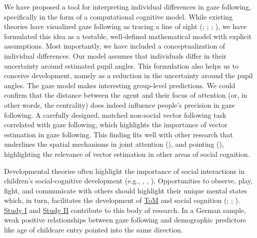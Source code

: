 \documentclass[
]{scrbook}
\begin{document}
We have proposed a tool for interpreting individual differences in gaze following, specifically in the form of a computational cognitive model. While existing theories have visualized gaze following as tracing a line of sight (; ; ; ), we have formulated this idea as a testable, well-defined mathematical model with explicit assumptions. Most importantly, we have included a conceptualization of individual differences. Our model assumes that individuals differ in their uncertainty around estimated pupil angles. This formulation also helps us to conceive development, namely as a reduction in the uncertainty around the pupil angles. The gaze model makes interesting group-level predictions. We could confirm that the distance between the agent and their focus of attention (or, in other words, the centrality) does indeed influence people's precision in gaze following. A carefully designed, matched non-social vector following task correlated with gaze following, which highlights the importance of vector estimation in gaze following. This finding fits well with other research that underlines the spatial mechanisms in joint attention (), and pointing (), highlighting the relevance of vector estimation in other areas of social cognition.

Developmental theories often highlight the importance of social interactions in children's social-cognitive development (e.g., , , ). Opportunities to observe, play, fight, and communicate with others should highlight their unique mental states which, in turn, facilitates the development of \hyperref[acronyms_ToM]{ToM} and social cognition (; ; ). \hyperref[studyI]{Study I} and \hyperref[studyII]{Study II} contribute to this body of research. In a German sample, weak positive relationships between gaze following and demographic predictors like age of childcare entry pointed into the same direction.
\end{document}
